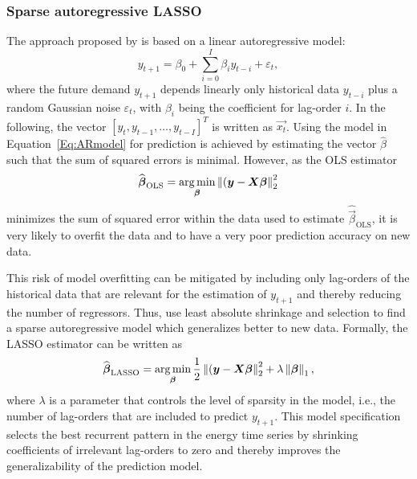 \subsubsection{Sparse autoregressive LASSO}

The approach proposed by \citet{Li:2017} is based on a linear autoregressive model:
%
\begin{equation} \label{Eq:ARmodel}
    y_{t+1}=\beta_0+\sum_{i=0}^I\beta_iy_{t-i}+\varepsilon_t,
\end{equation}
%
where the future demand $y_{t+1}$ depends linearly only historical data $y_{t-i}$ plus a random Gaussian noise $\varepsilon_t$, with $\beta_i$ being the coefficient for lag-order $i$. In the following, the vector $\left[y_t, y_{t-1}, \dots, y_{t-I}\right]^T$ is written as $\vec{x_t}$. Using the model in Equation~\ref{Eq:ARmodel} for prediction is achieved by estimating the vector $\widehat{\beta}$ such that the sum of squared errors is minimal. However, as the OLS estimator
%
\begin{equation} \label{Eq:betaOLS}
    \widehat{\boldsymbol{\beta}}_{\text{OLS}}=\operatorname*{\arg\min}_{\boldsymbol{\beta}}\left\lVert(\boldsymbol{y}-\boldsymbol{X}\boldsymbol{\beta}\right\rVert^2_2
\end{equation}
%
minimizes the sum of squared error within the data used to estimate $\widehat{\vec{\beta}}_{\text{OLS}}$, it is very likely to overfit the data and to have a very poor prediction accuracy on new data.

This risk of model overfitting can be mitigated by including only lag-orders of the historical data that are relevant for the estimation of $y_{t+1}$ and thereby reducing the number of regressors. Thus, \citet{Li:2017} use least absolute shrinkage and selection to find a sparse autoregressive model which generalizes better to new data. Formally, the LASSO estimator can be written as
%
\begin{equation} \label{Eq:betaLASSO}
    \widehat{\boldsymbol{\beta}}_{\text{LASSO}}=\operatorname*{\arg\min}_{\boldsymbol{\beta}}\frac{1}{2}\left\lVert(\boldsymbol{y}-\boldsymbol{X}\boldsymbol{\beta}\right\rVert^2_2+\lambda\left\lVert\boldsymbol{\beta}\right\rVert_1,
\end{equation}
%
where $\lambda$ is a parameter that controls the level of sparsity in the model, i.e., the number of lag-orders that are included to predict $y_{t+1}$. This model specification selects the best recurrent pattern in the energy time series by shrinking coefficients of irrelevant lag-orders to zero and thereby improves the generalizability of the prediction model.




